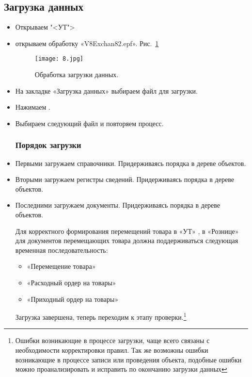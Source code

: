 \subsection{Загрузка данных}

\begin{itemize}	
	\item Открываем "<УТ">
	\item открываем обработку «V8Exchan82.epf».
	Рис.~\ref{ris:8.jpg}	
	\begin{figure}[H]
		\texttt{[image: 8.jpg]}
		\caption{Обработка загрузки данных.}
		\label{ris:8.jpg}
	\end{figure}
	
	\item На закладке «Загрузка данных» выбираем файл для загрузки.
	\item Нажимаем .
	\item Выбираем следующий файл и повторяем процесс.
\subsubsection{Порядок загрузки}	
	\item Первыми загружаем справочники. Придерживаясь порядка в дереве объектов.
	\item Вторыми загружаем регистры сведений. Придерживаясь порядка в дереве объектов.	
	\item Последними загружаем документы. Придерживаясь порядка в дереве объектов. \par \par
		Для корректного формирования перемещений товара в «УТ» , в «Рознице» для документов перемещающих товара должна поддерживаться следующая временная последовательность: 
	\begin{itemize}	
		\item	«Перемещение товара»
		\item	«Расходный ордер на товары»
		\item	«Приходный ордер на товары»
	\end{itemize}
	Загрузка завершена, теперь переходим к этапу проверки.\footnote{Ошибки возникающие в процессе загрузки, чаще всего связаны с необходимости корректировки правил. Так же возможны ошибки возникающие в процессе записи или проведения объекта, подобные ошибки можно проанализировать и исправить по окончанию загрузки данных}	

\end{itemize}
